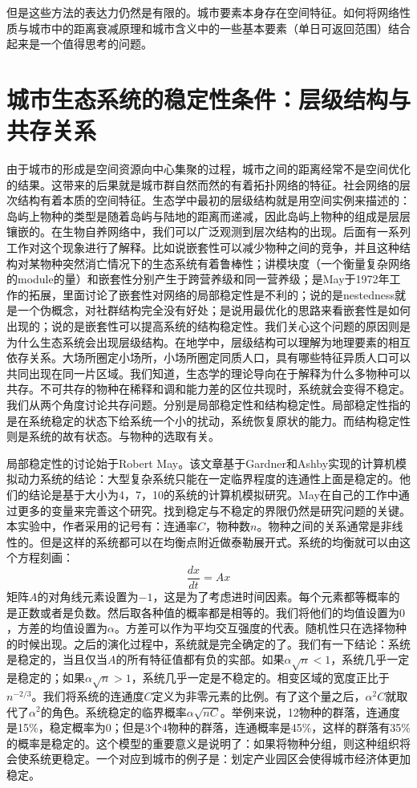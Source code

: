 但是这些方法的表达力仍然是有限的。城市要素本身存在空间特征。如何将网络性质与城市中的距离衰减原理和城市含义中的一些基本要素（单日可返回范围）结合起来是一个值得思考的问题。


\section{城市生态系统的稳定性条件：层级结构与共存关系}

由于城市的形成是空间资源向中心集聚的过程，城市之间的距离经常不是空间优化的结果。这带来的后果就是城市群自然而然的有着拓扑网络的特征。社会网络的层次结构有着本质的空间特征。生态学中最初的层级结构就是用空间实例来描述的：岛屿上物种的类型是随着岛屿与陆地的距离而递减，因此岛屿上物种的组成是层层镶嵌的。在生物自养网络\cite{Bascompte9383}中，我们可以广泛观测到层次结构的出现。后面有一系列工作对这个现象进行了解释。比如\cite{bastolla2009architecture}说嵌套性可以减少物种之间的竞争，并且这种结构对某物种突然消亡情况下的生态系统有着鲁棒性；\cite{thebault2010stability}讲模块度（一个衡量复杂网络的module的量）和嵌套性分别产生于跨营养级和同一营养级；\cite{Allesina2012}是May于1972年工作的拓展，里面讨论了嵌套性对网络的局部稳定性是不利的；\cite{james2012disentangling}说的是nestedness就是一个伪概念，对社群结构完全没有好处；\cite{suweis2013emergence}是说用最优化的思路来看嵌套性是如何出现的；\cite{rohr2014structural}说的是嵌套性可以提高系统的结构稳定性。我们关心这个问题的原因则是为什么生态系统会出现层级结构。在地学中，层级结构可以理解为地理要素的相互依存关系\cite{PhysRevE.83.036117}。大场所圈定小场所，小场所圈定同质人口，具有哪些特征异质人口可以共同出现在同一片区域。我们知道，生态学的理论导向在于解释为什么多物种可以共存。不可共存的物种在稀释和调和能力差的区位共现时，系统就会变得不稳定。我们从两个角度讨论共存问题。分别是局部稳定性和结构稳定性。局部稳定性指的是在系统稳定的状态下给系统一个小的扰动，系统恢复原状的能力。而结构稳定性则是系统的故有状态。与物种的选取有关。

局部稳定性的讨论始于Robert May\cite{may1972will}。该文章基于Gardner和Ashby实现的计算机模拟动力系统的结论：大型复杂系统只能在一定临界程度的连通性上面是稳定的。他们的结论是基于大小为4，7，10的系统的计算机模拟研究。May在自己的工作中通过更多的变量来完善这个研究。找到稳定与不稳定的界限仍然是研究问题的关键。本实验中，作者采用的记号有：连通率\(C\)，物种数\(n\)。物种之间的关系通常是非线性的。但是这样的系统都可以在均衡点附近做泰勒展开式。系统的均衡就可以由这个方程刻画：\[\frac{dx}{dt} = Ax\]矩阵\(A\)的对角线元素设置为\(-1\)，这是为了考虑进时间因素。每个元素都等概率的是正数或者是负数。然后取各种值的概率都是相等的。我们将他们的均值设置为\(0\)，方差的均值设置为\(\alpha\)。方差可以作为平均交互强度的代表。随机性只在选择物种的时候出现。之后的演化过程中，系统就是完全确定的了。我们有一下结论：系统是稳定的，当且仅当\(A\)的所有特征值都有负的实部。如果\(\alpha\sqrt{n}<1\)，系统几乎一定是稳定的；如果\(\alpha\sqrt{n}>1\)，系统几乎一定是不稳定的。相变区域的宽度正比于\(n^{-2/3}\)。我们将系统的连通度\(C\)定义为非零元素的比例。有了这个量之后，\(\alpha^2C\)就取代了\(\alpha^2\)的角色。系统稳定的临界概率\(\alpha\sqrt{nC}\)。举例来说，12物种的群落，连通度是15\%，稳定概率为0；但是3个4物种的群落，连通概率是45\%，这样的群落有35\%的概率是稳定的。这个模型的重要意义是说明了：如果将物种分组，则这种组织将会使系统更稳定。一个对应到城市的例子是：划定产业园区会使得城市经济体更加稳定。

